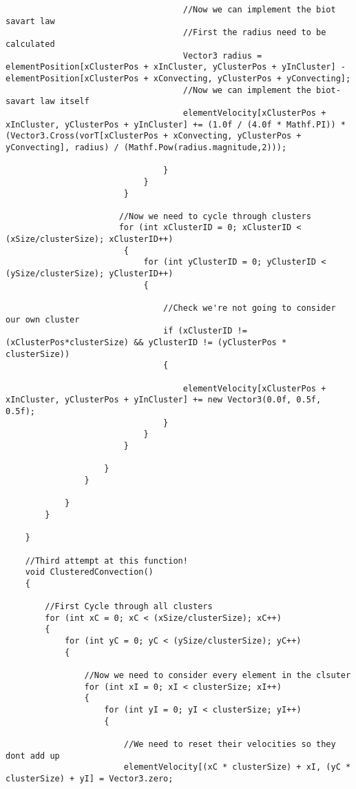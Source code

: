\begin{mdframed}[linecolor=black, topline=true, bottomline=true,
  leftline=false, rightline=false]
\begin{verbatim}
                                    //Now we can implement the biot savart law
                                    //First the radius need to be calculated
                                    Vector3 radius = elementPosition[xClusterPos + xInCluster, yClusterPos + yInCluster] - elementPosition[xClusterPos + xConvecting, yClusterPos + yConvecting];
                                    //Now we can implement the biot-savart law itself
                                    elementVelocity[xClusterPos + xInCluster, yClusterPos + yInCluster] += (1.0f / (4.0f * Mathf.PI)) * (Vector3.Cross(vorT[xClusterPos + xConvecting, yClusterPos + yConvecting], radius) / (Mathf.Pow(radius.magnitude,2)));

                                }
                            }
                        }

                       //Now we need to cycle through clusters
                       for (int xClusterID = 0; xClusterID < (xSize/clusterSize); xClusterID++)
                        {
                            for (int yClusterID = 0; yClusterID < (ySize/clusterSize); yClusterID++)
                            {

                                //Check we're not going to consider our own cluster
                                if (xClusterID != (xClusterPos*clusterSize) && yClusterID != (yClusterPos * clusterSize))
                                {

                                    elementVelocity[xClusterPos + xInCluster, yClusterPos + yInCluster] += new Vector3(0.0f, 0.5f, 0.5f);
                                }
                            }
                        }

                    }
                }

            }
        }

    }

    //Third attempt at this function!
    void ClusteredConvection()
    {

        //First Cycle through all clusters
        for (int xC = 0; xC < (xSize/clusterSize); xC++)
        {
            for (int yC = 0; yC < (ySize/clusterSize); yC++)
            {

                //Now we need to consider every element in the clsuter
                for (int xI = 0; xI < clusterSize; xI++)
                {
                    for (int yI = 0; yI < clusterSize; yI++)
                    {

                        //We need to reset their velocities so they dont add up
                        elementVelocity[(xC * clusterSize) + xI, (yC * clusterSize) + yI] = Vector3.zero;


\end{verbatim}
\end{mdframed}
